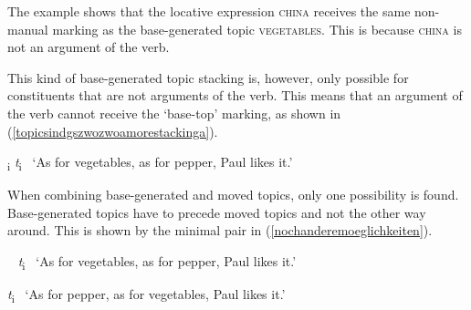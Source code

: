 \noindent The example shows that the locative expression \textsc{china} receives the same non-manual marking as the base-generated topic \textsc{vegetables}. This is because \textsc{china} is not an argument of the verb. %

This kind of base-generated topic stacking is, however, only possible for constituents that are not arguments of the verb. This means that an argument of the verb cannot receive the `base-top' marking, as shown in (\ref{topicsindgszwozwoamorestackinga}). 

\begin{exe} 
\ex * \textsubscript{\textup{i}} \textit{t}\textsubscript{i} 
\glt \textcolor{white}{*}`As for vegetables, as for pepper, Paul likes it.' \label{topicsindgszwozwoamorestackinga}
\end{exe}

\noindent When combining base-generated and moved topics, only one possibility is found. Base-generated topics have to precede moved topics and not the other way around. This is shown by the minimal pair in (\ref{nochanderemoeglichkeiten}).

\begin{exe} 
\ex\label{nochanderemoeglichkeiten}\begin{xlist}
\ex \textcolor{white}{*}   \textit{t}\textsubscript{i} 
%
\glt \textcolor{white}{*}`As for vegetables, as for pepper, Paul likes it.' \label{nochanderemoeglichkeitena}

\ex *   \textit{t}\textsubscript{i} 
%
\glt \textcolor{white}{*}`As for pepper, as for vegetables, Paul likes it.' \label{nochanderemoeglichkeitenb}

\end{xlist}
\end{exe}

